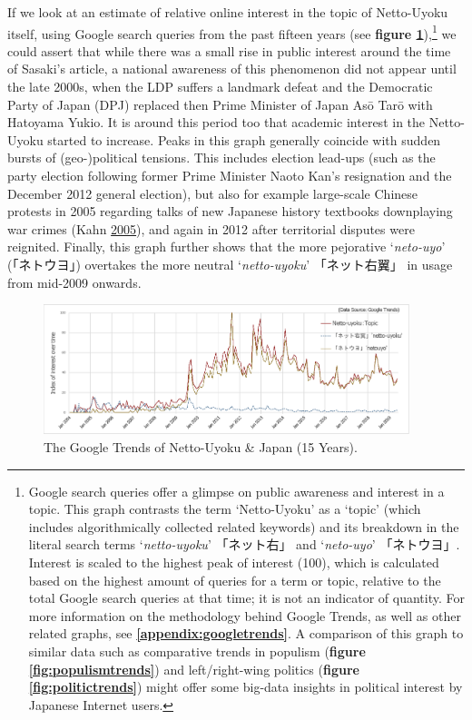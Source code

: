 \documentclass[10pt,british,A4paper,oneside]{memoir}
\begin{document}
If we look at an estimate of relative online interest in the topic of
Netto-Uyoku itself, using Google search queries from the past fifteen
years (see \textbf{figure \ref{fig:nettouyoku}}),\footnote{Google search
  queries offer a glimpse on public awareness and interest in a topic.
  This graph contrasts the term `Netto-Uyoku' as a `topic' (which
  includes algorithmically collected related keywords) and its breakdown
  in the literal search terms `\emph{netto-uyoku}' 「ネット右」 and
  `\emph{neto-uyo}' 「ネトウヨ」. Interest is scaled to the highest peak
  of interest (100), which is calculated based on the highest amount of
  queries for a term or topic, relative to the total Google search
  queries at that time; it is not an indicator of quantity. For more
  information on the methodology behind Google Trends, as well as other
  related graphs, see \textbf{\ref{appendix:googletrends}}. A comparison
  of this graph to similar data such as comparative trends in populism
  (\textbf{figure \ref{fig:populismtrends}}) and left/right-wing
  politics (\textbf{figure \ref{fig:politictrends}}) might offer some
  big-data insights in political interest by Japanese Internet users.}
we could assert that while there was a small rise in public interest
around the time of Sasaki's article, a national awareness of this
phenomenon did not appear until the late 2000s, when the LDP suffers a
landmark defeat and the Democratic Party of Japan (DPJ) replaced then
Prime Minister of Japan Asō Tarō with Hatoyama Yukio. It is around this
period too that academic interest in the Netto-Uyoku started to
increase. Peaks in this graph generally coincide with sudden bursts of
(geo-)political tensions. This includes election lead-ups (such as the
party election following former Prime Minister Naoto Kan's resignation
and the December 2012 general election), but also for example
large-scale Chinese protests in 2005 regarding talks of new Japanese
history textbooks downplaying war crimes (Kahn
\protect\hyperlink{ref-kahn_riot_2005}{2005}), and again in 2012 after
territorial disputes were reignited. Finally, this graph further shows
that the more pejorative `\emph{neto-uyo}' (「ネトウヨ」) overtakes the
more neutral `\emph{netto-uyoku}' 「ネット右翼」 in usage from mid-2009
onwards.

\begin{figure}[!htb]
 \centering
 \caption{\label{fig:nettouyoku} The Google Trends of Netto-Uyoku \& Japan (15 Years).}
 \includegraphics[width=0.95\textwidth,trim=4 4 4 4,clip]{images/nettouyoku2.eps}
\end{figure}
\end{document}
